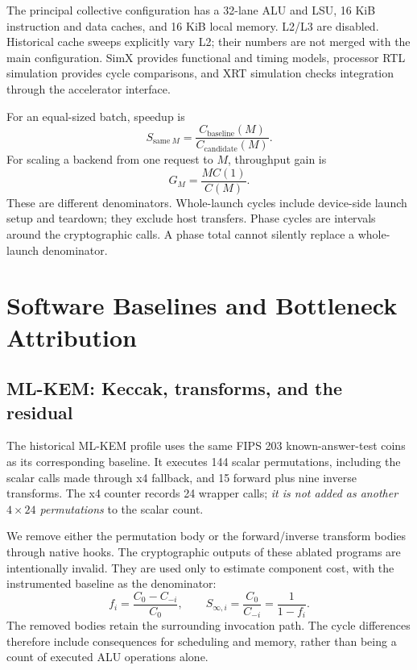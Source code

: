 \documentclass[conference,letterpaper]{IEEEtran}
\begin{document}
The principal collective configuration has a 32-lane ALU and LSU, 16 KiB
instruction and data caches, and 16 KiB local memory. L2/L3 are disabled.
Historical cache sweeps explicitly vary L2; their numbers are not merged
with the main configuration. SimX provides functional and timing models,
processor RTL simulation provides cycle comparisons, and XRT simulation
checks integration through the accelerator interface.

For an equal-sized batch, speedup is
\begin{equation}
S_{\mathrm{same}\ M}=\frac{C_{\mathrm{baseline}}(M)}{C_{\mathrm{candidate}}(M)}.
\end{equation}
For scaling a backend from one request to $M$, throughput gain is
\begin{equation}
G_M=\frac{M C(1)}{C(M)}.
\end{equation}
These are different denominators. Whole-launch cycles include device-side
launch setup and teardown; they exclude host transfers. Phase cycles are
intervals around the cryptographic calls. A phase total cannot silently
replace a whole-launch denominator.

\section{Software Baselines and Bottleneck Attribution}
\subsection{ML-KEM: Keccak, transforms, and the residual}
The historical ML-KEM profile uses the same FIPS 203 known-answer-test coins
as its corresponding baseline. It executes 144 scalar permutations,
including the scalar calls made through x4 fallback, and 15 forward plus
nine inverse transforms. The x4 counter records 24 wrapper calls;
\emph{it is not added as another $4\times24$ permutations} to the scalar count.

We remove either the permutation body or the forward/inverse transform
bodies through native hooks. The cryptographic outputs of these ablated
programs are intentionally invalid. They are used only to estimate component
cost, with the instrumented baseline as the denominator:
\begin{equation}
f_i=\frac{C_0-C_{-i}}{C_0},\qquad
S_{\infty,i}=\frac{C_0}{C_{-i}}=\frac{1}{1-f_i}.
\label{eq:ablation}
\end{equation}
The removed bodies retain the surrounding invocation path. The cycle
differences therefore include consequences for scheduling and memory, rather
than being a count of executed ALU operations alone.
\end{document}
